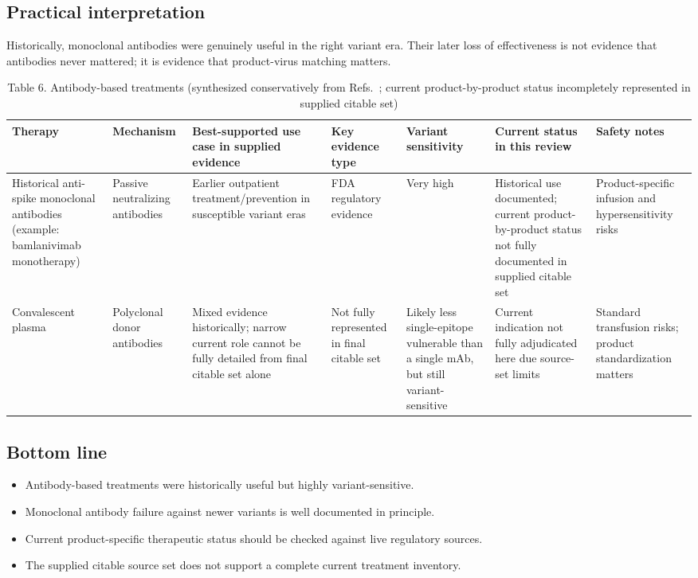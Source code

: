 \documentclass[12pt]{article}
\begin{document}
\subsection*{Practical interpretation}
Historically, monoclonal antibodies were genuinely useful in the right variant era. Their later loss of effectiveness is not evidence that antibodies never mattered; it is evidence that product-virus matching matters.

\begin{table}[H]
\centering
\caption{Table 6. Antibody-based treatments (synthesized conservatively from Refs.~\cite{ref6}; current product-by-product status incompletely represented in supplied citable set)}
\begin{tabularx}{\textwidth}{>{\raggedright\arraybackslash}p{2.8cm} >{\raggedright\arraybackslash}p{2.1cm} >{\raggedright\arraybackslash}X >{\raggedright\arraybackslash}p{2.3cm} >{\raggedright\arraybackslash}p{2.0cm} >{\raggedright\arraybackslash}p{2.0cm} >{\raggedright\arraybackslash}p{2.1cm}}
\toprule
Therapy & Mechanism & Best-supported use case in supplied evidence & Key evidence type & Variant sensitivity & Current status in this review & Safety notes \\
\midrule
Historical anti-spike monoclonal antibodies (example: bamlanivimab monotherapy) & Passive neutralizing antibodies & Earlier outpatient treatment/prevention in susceptible variant eras & FDA regulatory evidence \cite{ref6} & Very high & Historical use documented; current product-by-product status not fully documented in supplied citable set & Product-specific infusion and hypersensitivity risks \\
Convalescent plasma & Polyclonal donor antibodies & Mixed evidence historically; narrow current role cannot be fully detailed from final citable set alone & Not fully represented in final citable set & Likely less single-epitope vulnerable than a single mAb, but still variant-sensitive & Current indication not fully adjudicated here due source-set limits & Standard transfusion risks; product standardization matters \\
\bottomrule
\end{tabularx}
\end{table}

\subsection*{Bottom line}
\begin{itemize}[leftmargin=1.5em]
    \item Antibody-based treatments were historically useful but highly variant-sensitive.
    \item Monoclonal antibody failure against newer variants is well documented in principle.
    \item Current product-specific therapeutic status should be checked against live regulatory sources.
    \item The supplied citable source set does not support a complete current treatment inventory.
\end{itemize}
\end{document}
